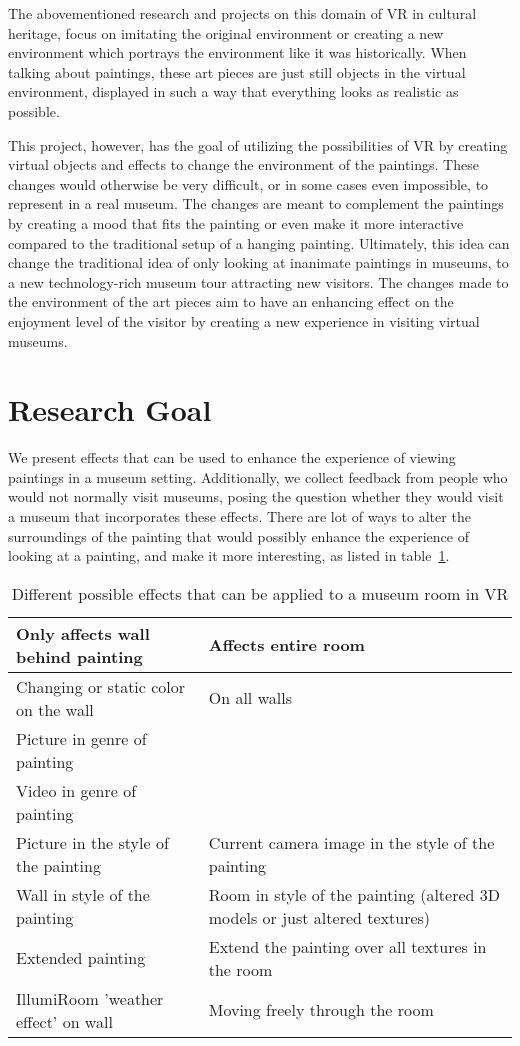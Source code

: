 \documentclass[a4paper]{article}
\begin{document}
The abovementioned research and projects on this domain of VR in cultural heritage, focus on imitating the original environment or creating a new environment which portrays the environment like it was historically. When talking about paintings, these art pieces are just still objects in the virtual environment, displayed in such a way that everything looks as realistic as possible.

This project, however, has the goal of utilizing the possibilities of VR by creating virtual objects and effects to change the environment of the paintings. These changes would otherwise be very difficult, or in some cases even impossible, to represent in a real museum. The changes are meant to complement the paintings by creating a mood that fits the painting or even make it more interactive compared to the traditional setup of a hanging painting. Ultimately, this idea can change the traditional idea of only looking at inanimate paintings in museums, to a new technology-rich museum tour attracting new visitors. The changes made to the environment of the art pieces aim to have an enhancing effect on the enjoyment level of the visitor by creating a new experience in visiting virtual museums.


\section{Research Goal}
We present effects that can be used to enhance the experience of viewing paintings in a museum setting. Additionally, we collect feedback from people who would not normally visit museums, posing the question whether they would visit a museum that incorporates these effects. There are lot of ways to alter the surroundings of the painting that would possibly enhance the experience of looking at a painting, and make it more interesting, as listed in table~\ref{tab:effect_ideas}.

\begin{table}
\begin{tabular}{ | p{5.5cm} | p{5.7cm} | }
\hline
\textbf{Only affects wall behind painting} & \textbf{Affects entire room} \\\hline
Changing or static color on the wall & On all walls \\\hline
Picture in genre of painting & \\\hline
Video in genre of painting & \\\hline
Picture in the style of the painting & Current camera image in the style of the painting \\\hline
Wall in style of the painting & Room in style of the painting (altered 3D models or just altered textures) \\\hline
Extended painting & Extend the painting over all textures in the room \\\hline
IllumiRoom 'weather effect' on wall & Moving freely through the room  \\\hline
\end{tabular}
\caption{Different possible effects that can be applied to a museum room in VR}
\label{tab:effect_ideas}
\end{table}
\end{document}

